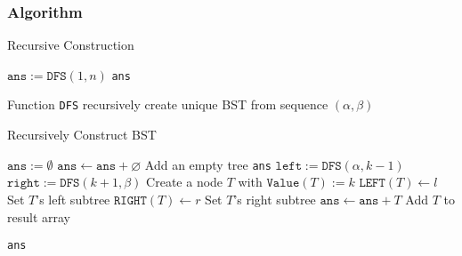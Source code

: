 \subsubsection{Algorithm}
\setcounter{algorithm}{0}
\begin{algorithm}[H]
\caption{Recursive Construction}
\begin{algorithmic}[1]
\State $\texttt{ans}:=\texttt{DFS}(1, n)$
\State \Return \texttt{ans}
\EndProcedure
\end{algorithmic}
\end{algorithm}
Function \texttt{DFS} recursively create unique BST from sequence $(\alpha, \beta)$
\begin{algorithm}[H]
\caption{Recursively Construct BST}
\begin{algorithmic}[1]
\State $\texttt{ans}:=\emptyset$
\If{$\alpha > \beta$}
\State $\texttt{ans} \gets \texttt{ans} + \varnothing$ \Comment Add an empty tree
\State \Return \texttt{ans}
\EndIf
{}
\State $\texttt{left}:=\texttt{DFS}(\alpha, k-1)$
\State $\texttt{right}:=\texttt{DFS}(k+1, \beta)$
\State Create a node $T$ with $\texttt{Value}(T):=k$
\State $\texttt{LEFT}(T)\gets l$ \Comment Set $T$'s left subtree
\State $\texttt{RIGHT}(T)\gets r$ \Comment Set $T$'s right subtree
\State $\texttt{ans} \gets \texttt{ans} + T $ \Comment Add $T$ to result array
\EndFor
\EndFor
{}
\end{algorithmic}
\end{algorithm}
\begin{algorithm}[H]
\begin{algorithmic}[1]
\EndFor
\State \Return \texttt{ans}
\EndFunction
\end{algorithmic}
\end{algorithm}
